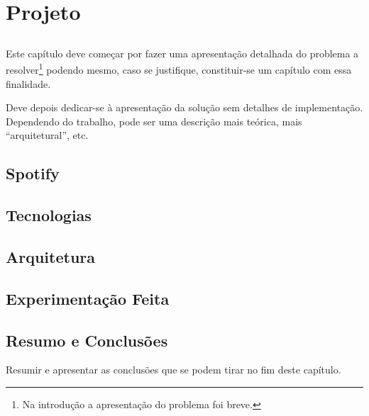
\chapter{Projeto}\label{chap:chap3}

\section*{}

Este capítulo deve começar por fazer uma apresentação detalhada do
problema a resolver\footnote{Na introdução a apresentação do
  problema foi breve.} podendo mesmo, caso se justifique,
constituir-se um capítulo com essa finalidade.

Deve depois dedicar-se à apresentação da solução sem detalhes de
implementação. 
Dependendo do trabalho, pode ser uma descrição mais teórica, mais
``arquitetural'', etc.

\section{Spotify} %
\label{sec:spotify}

\lipsum


\section{Tecnologias} %
\label{sec:tecnologias}


\section{Arquitetura} %
\label{sec:arquitetura}

\lipsum


\section{Experimentação Feita} %
\label{sec:experimentacao}


\section{Resumo e Conclusões}

Resumir e apresentar as conclusões que se podem tirar no fim deste
capítulo.
